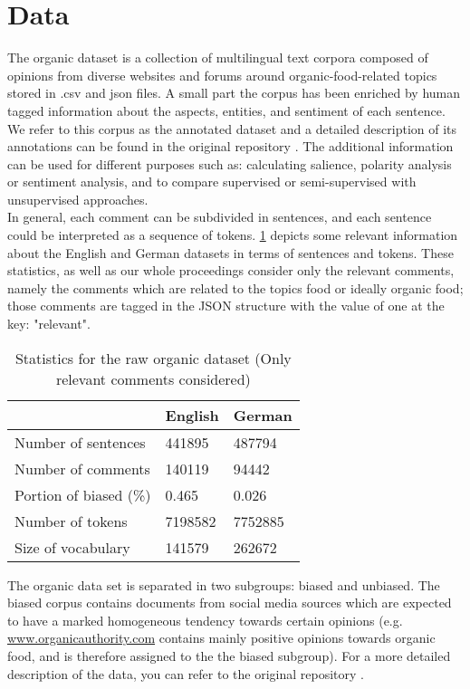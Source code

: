 \section{Data}
\label{sec:data}
The organic dataset is a collection of multilingual text corpora composed of opinions from diverse websites and forums around organic-food-related topics stored in .csv and json files.
A small part the corpus has been enriched by human tagged information about the aspects, entities, and sentiment of each sentence. We refer to this corpus as the annotated dataset and a detailed description of its annotations can be found in the original repository \cite{original_repo}. The additional information can be used for different purposes such as:  calculating salience, polarity analysis or sentiment analysis, and to compare supervised or semi-supervised with unsupervised approaches.\\
In general, each comment can be subdivided in sentences, and each sentence could be interpreted as a sequence of tokens. \cref{Table:data_statistics} depicts some relevant information about the English and German datasets in terms of sentences and tokens. These statistics, as well as our whole proceedings consider only the relevant comments, namely the comments which are related to the topics food or ideally organic food; those comments are tagged in the JSON structure with the value of one at the key: "relevant".
\begin{center}
    \begin{table}
    \centering
        \begin{tabular}{lll}
             \toprule
             & English & German  \\
             \midrule
             Number of sentences & 441895 & 487794 \\
             Number of comments & 140119 & 94442 \\
             Portion of biased (\%) & 0.465 & 0.026\\ 
             Number of tokens & 7198582 & 7752885 \\
             Size of vocabulary & 141579 & 262672\\
             \bottomrule
        \end{tabular}
        \caption{Statistics for the raw organic dataset (Only relevant comments considered)}
        \label{Table:data_statistics}
    \end{table}
\end{center}
The organic data set is separated in two subgroups: biased and unbiased. The biased corpus contains documents from social media sources which are expected to have a marked homogeneous tendency towards  certain opinions (e.g. \url{www.organicauthority.com} contains mainly positive opinions towards organic food, and is therefore assigned to the the biased subgroup). For a more detailed description of the data, you can refer to the original repository \cite{original_repo}.
